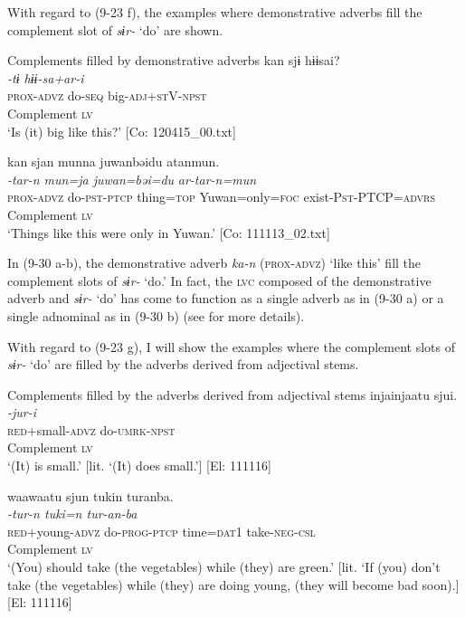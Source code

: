 With regard to (9-23 f), the examples where demonstrative adverbs fill the complement slot of \textit{sɨr-} ‘do’ are shown.

\ea   Complements filled by demonstrative adverbs \label{ex:9.30}
\ea %
 \gllll  kan  sjɨ  hɨɨsai?\\
      \textit{}  \textit{-tɨ  hɨɨ-sa+ar-i}\\
      \textsc{prox}-\textsc{advz}  do-\textsc{seq}  big-\textsc{adj}+\textsc{st}V-\textsc{npst}\\
      Complement  \textsc{lv}  \\
    \glt       ‘Is (it) big like this?’ [Co: 120415\_00.txt]

  \ex %
  \glll kan  sjan  munna  juwanbəidu   atanmun.\\
      \textit{}  \textit{-tar-n  mun=ja  juwan=bəi=du} \textit{ar-tar-n=mun}\\
      \textsc{prox}-\textsc{advz}  do-\textsc{pst}-\textsc{ptcp}  thing=\textsc{top}  Yuwan=only=\textsc{foc} exist-P\textsc{st}-PTCP=\textsc{advrs}\\
      Complement  \textsc{lv}\\
      \glt ‘Things like this were only in Yuwan.’   [Co: 111113\_02.txt]
    \z
\z

In (9-30 a-b), the demonstrative adverb \textit{ka-n} (\textsc{prox}-\textsc{advz}) ‘like this’ fill the complement slots of \textit{sɨr-} ‘do.’ In fact, the \textsc{lvc} composed of the demonstrative adverb and \textit{sɨr-} ‘do’ has come to function as a single adverb as in (9-30 a) or a single adnominal as in (9-30 b) (see  for more details).

With regard to (9-23 g), I will show the examples where the complement slots of \textit{sɨr-} ‘do’ are filled by the adverbs derived from adjectival stems.

\ea   Complements filled by the adverbs derived from adjectival stems \label{ex:9.31}
\ea %
 \gllll  injainjaatu  sjui.\\
      \textit{}  \textit{-jur-i}\\
      \textsc{red}+small-\textsc{advz}  do-\textsc{umrk}-\textsc{npst}\\
      Complement  \textsc{lv}\\
      \glt       ‘(It) is small.’ [lit. ‘(It) does small.’] [El: 111116]

\ex \label{ex:9.31b} %
    \gllll  waawaatu  sjun  tukin  turanba.\\
      \textit{}  \textit{-tur-n  tuki=n  tur-an-ba}\\
      \textsc{red}+young-\textsc{advz}  do-\textsc{prog}-\textsc{ptcp}  time=\textsc{dat}1  take-\textsc{neg}-\textsc{csl}\\
      Complement  \textsc{lv}    \\
      \glt  ‘(You) should take (the vegetables) while (they) are green.’ [lit. ‘If (you) don’t take (the vegetables) while (they) are doing young, (they will become bad soon).] [El: 111116]
    \z
\z

